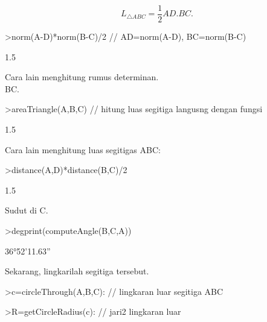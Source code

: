 \documentclass[12pt,arial,letterpaper]{book}
\begin{document}
\begin{eulernootebook}
\begin{eulercomment}
\begin{eulercomment}
\begin{eulernootebook}
\begin{eulercomment}
\begin{eulercomment}
\begin{eulercomment}
\begin{eulercomment}
\begin{eulercomment}
\begin{eulercomment}
\begin{eulernotebook}
\begin{eulercomment}
\begin{eulercomment}
\begin{eulercomment}
\end{eulercomment}
\begin{eulerformula}
\[
L_{\triangle ABC}= \frac{1}{2}AD.BC.
\]
\end{eulerformula}
\begin{eulerprompt}
>norm(A-D)*norm(B-C)/2 // AD=norm(A-D), BC=norm(B-C)
\end{eulerprompt}
\begin{euleroutput}
  1.5
\end{euleroutput}
\begin{eulercomment}
Cara lain menghitung rumus determinan.\\
BC.
\end{eulercomment}
\begin{eulerprompt}
>areaTriangle(A,B,C) // hitung luas segitiga langusng dengan fungsi
\end{eulerprompt}
\begin{euleroutput}
  1.5
\end{euleroutput}
\begin{eulercomment}
Cara lain menghitung luas segitigas ABC:
\end{eulercomment}
\begin{eulerprompt}
>distance(A,D)*distance(B,C)/2
\end{eulerprompt}
\begin{euleroutput}
  1.5
\end{euleroutput}
\begin{eulercomment}
Sudut di C.
\end{eulercomment}
\begin{eulerprompt}
>degprint(computeAngle(B,C,A))
\end{eulerprompt}
\begin{euleroutput}
  36°52'11.63''
\end{euleroutput}
\begin{eulercomment}
Sekarang, lingkarilah segitiga tersebut.
\end{eulercomment}
\begin{eulerprompt}
>c=circleThrough(A,B,C): // lingkaran luar segitiga ABC
\end{eulerprompt}
\begin{eulerprompt}
>R=getCircleRadius(c): // jari2 lingkaran luar 
\end{eulerprompt}
\begin{eulerprompt}

\end{eulerprompt}
\end{eulercomment}
\end{eulercomment}
\end{eulernotebook}
\end{eulercomment}
\end{eulercomment}
\end{eulercomment}
\end{eulercomment}
\end{eulercomment}
\end{eulercomment}
\end{eulernootebook}
\end{eulercomment}
\end{eulercomment}
\end{eulernootebook}
\end{document}
